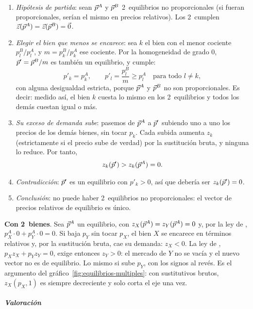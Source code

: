 \documentclass[11pt]{article}
\begin{document}
\begin{enumerate}
\item \emph{Hipótesis de partida}: sean $\vec{p}^A$ y $\vec{p}^B$ 2~equilibrios no proporcionales (si fueran proporcionales, serían el mismo en precios relativos). Los 2~cumplen $\vec{z}(\vec{p}^A)=\vec{z}(\vec{p}^B)=\vec{0}$.
\item \emph{Elegir el bien que menos se encarece}: sea $k$ el bien con el menor cociente $p^B_l/p^A_l$, y $m=p^B_k/p^A_k$ ese cociente. Por la homogeneidad de grado 0, $\vec{p}'=\vec{p}^B/m$ es también un equilibrio, y cumple:
  \[
  p'_k=p^A_k,\qquad p'_l=\frac{p^B_l}{m}\geq p^A_l\quad\text{para todo }l\neq k,
  \]
  con alguna desigualdad estricta, porque $\vec{p}^A$ y $\vec{p}^B$ no son proporcionales. Es decir: medido así, el bien $k$ cuesta lo mismo en los 2~equilibrios y todos los demás cuestan igual o más.
\item \emph{Su exceso de demanda sube}: pasemos de $\vec{p}^A$ a $\vec{p}'$ subiendo uno a uno los precios de los demás bienes, sin tocar $p_k$. Cada subida aumenta $z_k$ (estrictamente si el precio sube de verdad) por la sustitución bruta, y ninguna lo reduce. Por tanto,
  \[
  z_k(\vec{p}')>z_k(\vec{p}^A)=0 .
  \]
\item \emph{Contradicción}: $\vec{p}'$ es un equilibrio con $p'_k>0$, así que debería ser $z_k(\vec{p}')=0$.
\item \emph{Conclusión}: no puede haber 2~equilibrios no proporcionales: el vector de precios relativos de equilibrio es único.\findemo
\end{enumerate}

\begin{anotaciones}
\textbf{Con 2~bienes}. Sea $\vec{p}^A$ un equilibrio, con $z_X(\vec{p}^A)=z_Y(\vec{p}^A)=0$ y, por la ley de , $p^A_X\cdot 0+p^A_Y\cdot 0=0$. Si baja $p_Y$ sin tocar $p_X$, el bien $X$ se encarece en términos relativos y, por la sustitución bruta, cae su demanda: $z_X<0$. La ley de , $p_Xz_X+p_Yz_Y=0$, exige entonces $z_Y>0$: el mercado de $Y$ no se vacía y el nuevo vector no es de equilibrio. Lo mismo si sube $p_Y$, con los signos al revés. Es el argumento del gráfico~\ref{fig:equilibrios-multiples}: con sustitutivos brutos, $z_X(p_X,1)$ es siempre decreciente y solo corta el eje una vez.
\end{anotaciones}

\subparagraph{Valoración}
\end{document}
